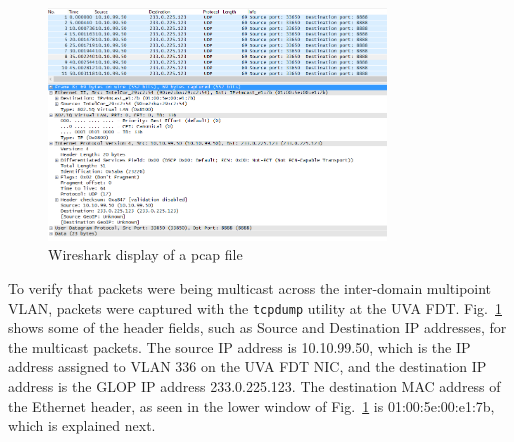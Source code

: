 \begin{figure}[htb!]
\centering
\includegraphics[width=0.8\textwidth]{figures/pcap.png}
\caption{Wireshark display of a pcap file}
\label{fig:multicast-pcap}
\end{figure}
To verify that packets were being multicast across the inter-domain multipoint VLAN, packets were captured with the \texttt{tcpdump} utility at the UVA FDT. Fig.~\ref{fig:multicast-pcap} shows some of the header fields, such as Source and Destination IP addresses, for the multicast packets. The source IP address is 10.10.99.50, which is the IP address assigned to VLAN 336 on the UVA FDT NIC, and the destination IP address is the GLOP IP address 233.0.225.123.
The destination MAC address of the Ethernet header, as seen in the lower window of Fig.~\ref{fig:multicast-pcap} is 01:00:5e:00:e1:7b, which is explained next.

